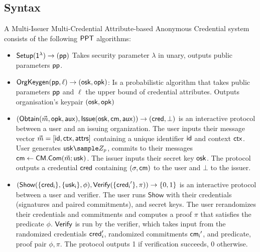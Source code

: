 \subsection{Syntax}
\begin{definition} A Multi-Issuer Multi-Credential Attribute-based Anonymous Credential system consists of the following $\mathsf{PPT}$ algorithms:
    \begin{itemize}
    \item $\mathsf{Setup}(\mathsf{1^{\lambda}}) \to (\mathsf{pp})$ Takes security parameter $\lambda$ in unary, outputs public parameters $\mathsf{pp}$.
    
    \item $\mathsf{OrgKeygen}(\mathsf{pp}, \ell) \to (\mathsf{osk}, \mathsf{opk})$: Is a probabilistic algorithm that takes public parameters $\mathsf{pp}$ and $\ell$ the upper bound of credential attributes. Outputs organisation's keypair $(\mathsf{osk}, \mathsf{opk})$
    
    
    \item $(\mathsf{Obtain}(\vec{m}, \mathsf{opk}, \mathsf{aux}), \mathsf{Issue}(\mathsf{osk}, \mathsf{cm}, \mathsf{aux})) \rightarrow (\mathsf{cred}, \bot)$ is an interactive protocol between a user and an issuing organization. The user inputs their message vector $\vec{m} = [\mathsf{id}, \mathsf{ctx}, \mathsf{attrs}]$ containing a unique identifier $\mathsf{id}$ and context $\mathsf{ctx}$. User generates $\usk \sample Z_p$, commits to their messages $\mathsf{cm} \gets \mathsf{CM.Com}(\vec{m}; \mathsf{usk})$. The issuer inputs their secret key $\mathsf{osk}$. The protocol outputs a credential $\mathsf{cred}$ containing $(\sigma, \mathsf{cm})$ to the user and $\bot$ to the issuer.    
    
    \item $(\mathsf{Show}(\{\mathsf{cred_i}\}, \{\mathsf{usk_i}\}, \phi), \mathsf{Verify}(\{\mathsf{cred_i}'\}, \pi)) \rightarrow \{0,1\}$ is an interactive protocol between a user and verifier. The user runs $\mathsf{Show}$ with their credentials (signatures and paired commitments), and secret keys. The user rerandomizes their credentials and commitments and computes a proof $\pi$ that satisfies the predicate $\phi$.
    $\mathsf{Verify}$ is run by the verifier, which takes input from the randomized credentials $\mathsf{cred}_i'$, randomized commitments $\mathsf{cm_i}'$, and predicate, proof pair $\phi, \pi$. The protocol outputs 1 if verification succeeds, 0 otherwise.
    \end{itemize}
\end{definition}

